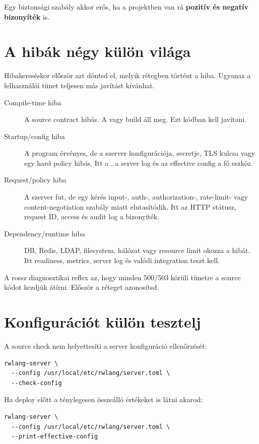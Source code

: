 Egy biztonsági szabály akkor erős, ha a projektben van rá \textbf{pozitív és negatív bizonyíték} is.

\section{A hibák négy külön világa}

Hibakereséskor először azt döntsd el, melyik rétegben történt a hiba. Ugyanaz a felhasználói tünet teljesen más javítást kívánhat.

\begin{description}
  \item[Compile-time hiba] A source contract hibás. A  vagy build áll meg. Ezt kódban kell javítani.
  \item[Startup/config hiba] A program érvényes, de a szerver konfigurációja, secretje, TLS kulcsa vagy egy hard policy hibás. Itt a , a server log és az effective config a fő eszköz.
  \item[Request/policy hiba] A szerver fut, de egy kérés input-, auth-, authorization-, rate-limit- vagy content-negotiation szabály miatt elutasítódik. Itt az HTTP státusz, request ID, access és audit log a bizonyíték.
  \item[Dependency/runtime hiba] DB, Redis, LDAP, filesystem, hálózat vagy resource limit okozza a hibát. Itt readiness, metrics, server log és valódi integration teszt kell.
\end{description}

A rossz diagnosztikai reflex az, hogy minden 500/503 körüli tünetre a source kódot kezdjük átírni. Először a réteget azonosítsd.

\section{Konfigurációt külön tesztelj}

A source check nem helyettesíti a server konfiguráció ellenőrzését:

\begin{lstlisting}
rwlang-server \
  --config /usr/local/etc/rwlang/server.toml \
  --check-config
\end{lstlisting}

Ha deploy előtt a ténylegesen összeálló értékeket is látni akarod:

\begin{lstlisting}
rwlang-server \
  --config /usr/local/etc/rwlang/server.toml \
  --print-effective-config
\end{lstlisting}

